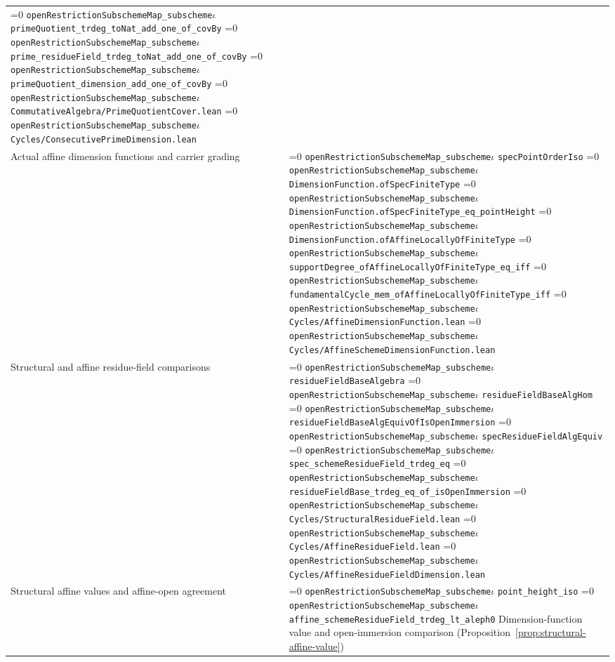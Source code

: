 \documentclass[11pt]{article}
\theoremstyle{definition}
\theoremstyle{remark}
\newcommand{\leanpath}[1]{%
  \ifnum\pdfstrcmp{\detokenize{#1}}%
      {\detokenize{openRestrictionSubschemeMap_subschemeι}}=0
    \texttt{\nolinkurl{openRestrictionSubschemeMap_subscheme}}\ensuremath{\iota}%
  \else
    \texttt{\nolinkurl{#1}}%
  \fi}
\begin{document}
\begin{longtable}{@{}>{\raggedright\arraybackslash}p{}
                >{\raggedright\arraybackslash}p{}@{}}
\leanpath{primeQuotient_trdeg_toNat_add_one_of_covBy}\newline
\leanpath{prime_residueField_trdeg_toNat_add_one_of_covBy}\newline
\leanpath{primeQuotient_dimension_add_one_of_covBy}\newline
\leanpath{CommutativeAlgebra/PrimeQuotientCover.lean}\newline
\leanpath{Cycles/ConsecutivePrimeDimension.lean}\\
Actual affine dimension functions and carrier grading &
\leanpath{specPointOrderIso}\newline
\leanpath{DimensionFunction.ofSpecFiniteType}\newline
\leanpath{DimensionFunction.ofSpecFiniteType_eq_pointHeight}\newline
\leanpath{DimensionFunction.ofAffineLocallyOfFiniteType}\newline
\leanpath{supportDegree_ofAffineLocallyOfFiniteType_eq_iff}\newline
\leanpath{fundamentalCycle_mem_ofAffineLocallyOfFiniteType_iff}\newline
\leanpath{Cycles/AffineDimensionFunction.lean}\newline
\leanpath{Cycles/AffineSchemeDimensionFunction.lean}\\
Structural and affine residue-field comparisons &
\leanpath{residueFieldBaseAlgebra}\newline
\leanpath{residueFieldBaseAlgHom}\newline
\leanpath{residueFieldBaseAlgEquivOfIsOpenImmersion}\newline
\leanpath{specResidueFieldAlgEquiv}\newline
\leanpath{spec_schemeResidueField_trdeg_eq}\newline
\leanpath{residueFieldBase_trdeg_eq_of_isOpenImmersion}\newline
\leanpath{Cycles/StructuralResidueField.lean}\newline
\leanpath{Cycles/AffineResidueField.lean}\newline
\leanpath{Cycles/AffineResidueFieldDimension.lean}\\
Structural affine values and affine-open agreement &
\leanpath{point_height_iso}\newline
\leanpath{affine_schemeResidueField_trdeg_lt_aleph0}\newline
Dimension-function value and open-immersion comparison
(Proposition~\ref{prop:structural-affine-value})\newline

\end{longtable}
\end{document}
